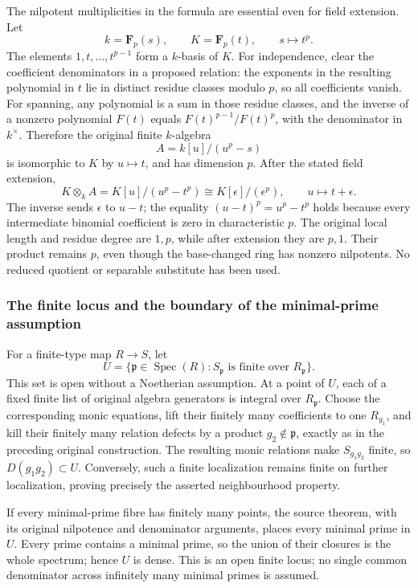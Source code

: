 The nilpotent multiplicities in the formula are essential even for field extension. Let \[
 k=\mathbf F_p(s),\qquad K=\mathbf F_p(t),
 \qquad s\longmapsto t^p.
\] The elements \(1,t,\ldots,t^{p-1}\) form a \(k\)-basis of \(K\). For independence, clear the coefficient denominators in a proposed relation: the exponents in the resulting polynomial in \(t\) lie in distinct residue classes modulo \(p\), so all coefficients vanish. For spanning, any polynomial is a sum in those residue classes, and the inverse of a nonzero polynomial \(F(t)\) equals \(F(t)^{p-1}/F(t)^p\), with the denominator in \(k^\times\). Therefore the original finite \(k\)-algebra \[
 A=k[u]/(u^p-s)
\] is isomorphic to \(K\) by \(u\mapsto t\), and has dimension \(p\). After the stated field extension, \[
 K\otimes_k A
 =K[u]/(u^p-t^p)
 \cong K[\epsilon]/(\epsilon^p),\qquad u\longmapsto t+\epsilon.
\] The inverse sends \(\epsilon\) to \(u-t\); the equality \((u-t)^p=u^p-t^p\) holds because every intermediate binomial coefficient is zero in characteristic \(p\). The original local length and residue degree are \(1,p\), while after extension they are \(p,1\). Their product remains \(p\), even though the base-changed ring has nonzero nilpotents. No reduced quotient or separable substitute has been used.

\subsubsection{The finite locus and the boundary of the minimal-prime assumption}\label{the-finite-locus-and-the-boundary-of-the-minimal-prime-assumption}

For a finite-type map \(R\to S\), let \[
 U=\{\mathfrak p\in\operatorname{Spec}(R):
                     S_{\mathfrak p}\text{ is finite over }R_{\mathfrak p}\}.
\] This set is open without a Noetherian assumption. At a point of \(U\), each of a fixed finite list of original algebra generators is integral over \(R_{\mathfrak p}\). Choose the corresponding monic equations, lift their finitely many coefficients to one \(R_{g_1}\), and kill their finitely many relation defects by a product \(g_2\notin\mathfrak p\), exactly as in the preceding original construction. The resulting monic relations make \(S_{g_1g_2}\) finite, so \(D(g_1g_2)\subset U\). Conversely, such a finite localization remains finite on further localization, proving precisely the asserted neighbourhood property.

If every minimal-prime fibre has finitely many points, the source theorem, with its original nilpotence and denominator arguments, places every minimal prime in \(U\). Every prime contains a minimal prime, so the union of their closures is the whole spectrum; hence \(U\) is dense. This is an open finite locus; no single common denominator across infinitely many minimal primes is assumed.

